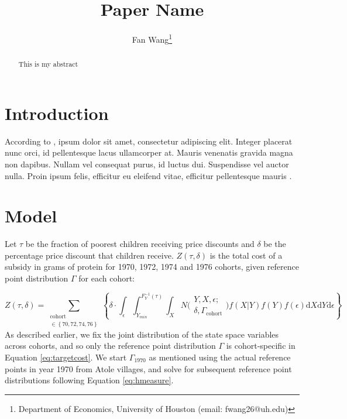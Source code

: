 \documentclass[12pt,english]{article}
\begin{document}
\title{Paper Name}

\author{Fan Wang\thanks{Department of Economics, University of Houston (email: fwang26@uh.edu)}}

\maketitle
\begin{abstract}
\singlespacing This is my abstract \end{abstract}
\vfill
\pagebreak{}

\section{Introduction}

According to \textcite{becker_human_1986}, ipsum dolor sit amet, consectetur adipiscing elit. Integer placerat nunc orci, id pellentesque lacus ullamcorper at. Mauris venenatis gravida magna non dapibus. Nullam vel consequat purus, id luctus dui. Suspendisse vel auctor nulla. Proin ipsum felis, efficitur eu eleifend vitae, efficitur pellentesque mauris \autocite{case_lasting_2005, conti_understanding_2010}.

\section{Model}

Let $\tau$ be the fraction of poorest children receiving price discounts and $\delta$ be the percentage price discount that children receive. $Z\left(\tau,\delta\right)$ is the total cost of a subsidy in grams of protein for 1970, 1972, 1974 and 1976 cohorts, given reference point distribution $\Gamma$ for each cohort:

\begin{equation}
\label{eq:targetcost}
Z\left(\tau,\delta\right) =
\sum\limits_{
	\substack{
	\mathrm{cohort} \\ \in{\left\{70,72,74,76\right\}}}
	}
\left\{\delta\cdot
\int_{\epsilon}
\int_{Y_{min}}^{F_{Y}^{-1}\left(\tau\right)}
\int_{X}
N\Big(
\substack{
	Y,X,\epsilon; \\
	\delta, \Gamma_{\mathrm{cohort}}
}
\Big)f\left(X|Y\right)f\left(Y\right)f\left(\epsilon\right)\mathrm{d}X\mathrm{d}Y\mathrm{d}\epsilon\right\}
\end{equation}
As described earlier, we fix the joint distribution of the state space variables across cohorts, and so only the reference point distribution $\Gamma$ is cohort-specific in Equation \ref{eq:targetcost}. We start $\Gamma_{1970}$ as mentioned using the actual reference points in year 1970 from Atole villages, and solve for subsequent reference point distributions following Equation \ref{eq:hmeasure}.
\end{document}
